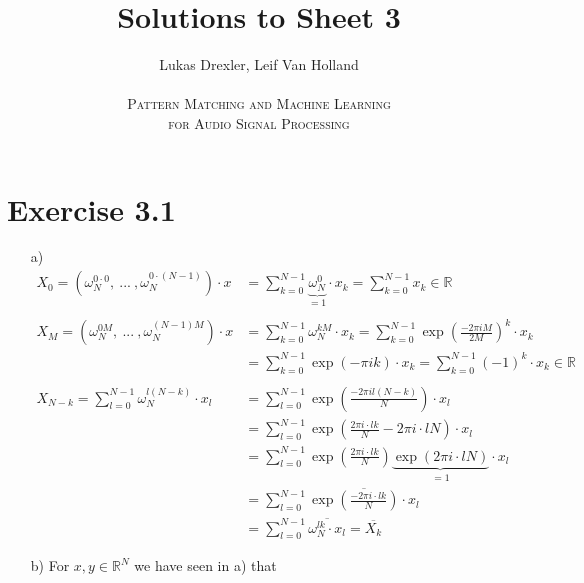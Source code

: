 \documentclass[12pt]{article}
\newcommand{\R}{\mathbb{R}}
\begin{document}
\title{Solutions to Sheet 3}
\author{Lukas Drexler, Leif Van Holland \\ \\
\textsc{Pattern Matching and Machine Learning} \\
\textsc{for Audio Signal Processing}}
\maketitle

\section*{Exercise 3.1}
\begin{itemize}
    \item[a)] \begin{align*}
        X_0 = \left(\omega_N^{0\cdot 0},\: ...\:, \omega_N^{0\cdot (N-1)}\right)\cdot x
        &=\sum_{k=0}^{N-1} \underbrace{\omega_N^0}_{=1}\cdot x_k
        = \sum_{k=0}^{N-1} x_k \in \R \\
        \\
        X_M = \left(\omega_N^{0M},\: ...\:, \omega_N^{(N-1)M}\right)\cdot x
        &= \sum_{k=0}^{N-1}\omega_N^{k M}\cdot x_k
        = \sum_{k=0}^{N-1}\exp\left(\frac{-2\pi i M}{2M}\right)^k\cdot x_k \\
        &= \sum_{k=0}^{N-1}\exp(-\pi i k)\cdot x_k = \sum_{k=0}^{N-1} (-1)^k \cdot x_k \in \R \\
        \\
        X_{N-k} = \sum_{l=0}^{N-1} \omega_N^{l(N-k)}\cdot x_l 
        &= \sum_{l=0}^{N-1} \exp\left(\frac{-2\pi i l (N-k)}{N}\right)\cdot x_l \\
        &= \sum_{l=0}^{N-1} \exp\left(\frac{2\pi i\cdot l k}{N} - 2\pi i\cdot l N\right)\cdot x_l \\
        &= \sum_{l=0}^{N-1} \exp\left(\frac{2\pi i\cdot l k}{N} \right) \underbrace{\exp(2\pi i\cdot l N)}_{=1}\cdot x_l \\
        &= \sum_{l=0}^{N-1} \overline{\exp\left(\frac{-2\pi i \cdot l k}{N}\right)\cdot x_l} \\
        &= \sum_{l=0}^{N-1} \overline{\omega_N^{lk} \cdot x_l} = \overline{X_k}
    \end{align*}
    \item[b)] For $x,y \in \R^N$ we have seen in a) that 

\end{itemize}
\end{document}
